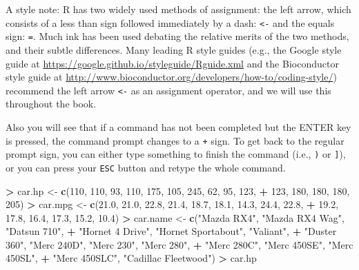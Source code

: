 \documentclass[]{krantz}
\makeatletter
\newenvironment{Shaded}{\begin{snugshade}}{\end{snugshade}}
\newcommand{\KeywordTok}[1]{\textcolor[rgb]{0.27,0.27,0.27}{\textbf{#1}}}
\newcommand{\DecValTok}[1]{\textcolor[rgb]{0.06,0.06,0.06}{#1}}
\newcommand{\FloatTok}[1]{\textcolor[rgb]{0.06,0.06,0.06}{#1}}
\newcommand{\StringTok}[1]{\textcolor[rgb]{0.5,0.5,0.5}{#1}}
\newcommand{\OperatorTok}[1]{\textcolor[rgb]{0.43,0.43,0.43}{\textbf{#1}}}
\newcommand{\NormalTok}[1]{#1}
\newenvironment{kframe}{%
\medskip{}
\setlength{\fboxsep}{.8em}
 \def\at@end@of@kframe{}%
 \ifinner\ifhmode%
  \def\at@end@of@kframe{\end{minipage}}%
  \begin{minipage}{\columnwidth}%
 \fi\fi%
 \def\FrameCommand##1{\hskip\@totalleftmargin \hskip-\fboxsep
 \colorbox{shadecolor}{##1}\hskip-\fboxsep
     \hskip-\linewidth \hskip-\@totalleftmargin \hskip\columnwidth}%
 \MakeFramed {\advance\hsize-\width
   \@totalleftmargin\z@ \linewidth\hsize
   \@setminipage}}%
 {\par\unskip\endMakeFramed%
 \at@end@of@kframe}
\renewenvironment{Shaded}{\begin{kframe}}{\end{kframe}}
\makeatother
\begin{document}
A style note: R has two widely used methods of assignment: the left
arrow, which consists of a less than sign followed immediately by a
dash: \texttt{\textless{}-} and the equals sign: \texttt{=}. Much ink
has been used debating the relative merits of the two methods, and their
subtle differences. Many leading R style guides (e.g., the Google style
guide at \url{https://google.github.io/styleguide/Rguide.xml} and the
Bioconductor style guide at
\url{http://www.bioconductor.org/developers/how-to/coding-style/})
recommend the left arrow \texttt{\textless{}-} as an assignment
operator, and we will use this throughout the book.

Also you will see that if a command has not been completed but the ENTER
key is pressed, the command prompt changes to a \texttt{+} sign. To get
back to the regular prompt sign, you can either type something to finish
the command (i.e., \texttt{)} or \texttt{{]}}), or you can press your
\texttt{ESC} button and retype the whole command.

\begin{Shaded}
\begin{Highlighting}[]
\OperatorTok{>}\StringTok{ }\NormalTok{car.hp <-}\StringTok{ }\KeywordTok{c}\NormalTok{(}\DecValTok{110}\NormalTok{, }\DecValTok{110}\NormalTok{, }\DecValTok{93}\NormalTok{, }\DecValTok{110}\NormalTok{, }\DecValTok{175}\NormalTok{, }\DecValTok{105}\NormalTok{, }\DecValTok{245}\NormalTok{, }\DecValTok{62}\NormalTok{, }\DecValTok{95}\NormalTok{, }\DecValTok{123}\NormalTok{, }
\OperatorTok{+}\StringTok{ }\DecValTok{123}\NormalTok{, }\DecValTok{180}\NormalTok{, }\DecValTok{180}\NormalTok{, }\DecValTok{180}\NormalTok{, }\DecValTok{205}\NormalTok{)}
\OperatorTok{>}\StringTok{ }\NormalTok{car.mpg <-}\StringTok{ }\KeywordTok{c}\NormalTok{(}\FloatTok{21.0}\NormalTok{, }\FloatTok{21.0}\NormalTok{, }\FloatTok{22.8}\NormalTok{, }\FloatTok{21.4}\NormalTok{, }\FloatTok{18.7}\NormalTok{, }\FloatTok{18.1}\NormalTok{, }\FloatTok{14.3}\NormalTok{, }\FloatTok{24.4}\NormalTok{, }\FloatTok{22.8}\NormalTok{, }
\OperatorTok{+}\StringTok{              }\FloatTok{19.2}\NormalTok{, }\FloatTok{17.8}\NormalTok{, }\FloatTok{16.4}\NormalTok{, }\FloatTok{17.3}\NormalTok{, }\FloatTok{15.2}\NormalTok{, }\FloatTok{10.4}\NormalTok{)}
\OperatorTok{>}\StringTok{ }\NormalTok{car.name <-}\StringTok{ }\KeywordTok{c}\NormalTok{(}\StringTok{"Mazda RX4"}\NormalTok{, }\StringTok{"Mazda RX4 Wag"}\NormalTok{, }\StringTok{"Datsun 710"}\NormalTok{, }
\OperatorTok{+}\StringTok{               "Hornet 4 Drive"}\NormalTok{, }\StringTok{"Hornet Sportabout"}\NormalTok{, }\StringTok{"Valiant"}\NormalTok{, }
\OperatorTok{+}\StringTok{               "Duster 360"}\NormalTok{, }\StringTok{"Merc 240D"}\NormalTok{, }\StringTok{"Merc 230"}\NormalTok{, }\StringTok{"Merc 280"}\NormalTok{, }
\OperatorTok{+}\StringTok{               "Merc 280C"}\NormalTok{, }\StringTok{"Merc 450SE"}\NormalTok{, }\StringTok{"Merc 450SL"}\NormalTok{, }
\OperatorTok{+}\StringTok{               "Merc 450SLC"}\NormalTok{, }\StringTok{"Cadillac Fleetwood"}\NormalTok{)}
\OperatorTok{>}\StringTok{ }\NormalTok{car.hp}
\end{Highlighting}
\end{Shaded}
\end{document}
